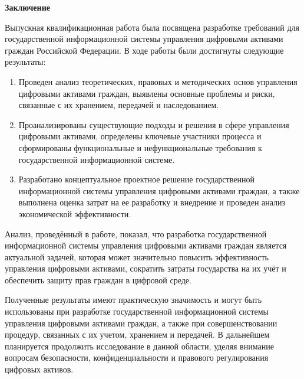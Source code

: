 \newpage
\begin{center}
  \textbf{Заключение}
\end{center}

Выпускная квалификационная работа была посвящена разработке требований для государственной информационной системы управления цифровыми активами граждан Российской Федерации. В ходе работы были достигнуты следующие результаты:

\begin{enumerate}
\item Проведен анализ теоретических, правовых и методических основ управления цифровыми активами граждан, выявлены основные проблемы и риски, связанные с их хранением, передачей и наследованием.
\item Проанализированы существующие подходы и решения в сфере управления цифровыми активами, определены ключевые участники процесса и сформированы функциональные и нефункциональные требования к государственной информационной системе.
\item Разработано концептуальное проектное решение государственной информационной системы управления цифровыми активами граждан, а также выполнена оценка затрат на ее разработку и внедрение и проведен анализ экономической эффективности.
\end{enumerate}

Анализ, проведённый в работе, показал, что разработка государственной информационной системы управления цифровыми активами граждан является актуальной задачей, которая может значительно повысить эффективность управления цифровыми активами, сократить затраты государства на их учёт и обеспечить защиту прав граждан в цифровой среде.

Полученные результаты имеют практическую значимость и могут быть использованы при разработке государственной информационной системы управления цифровыми активами граждан, а также при совершенствовании процедур, связанных с их учетом, хранением и передачей. В дальнейшем планируется продолжить исследование в данной области, уделяя внимание вопросам безопасности, конфиденциальности и правового регулирования цифровых активов.